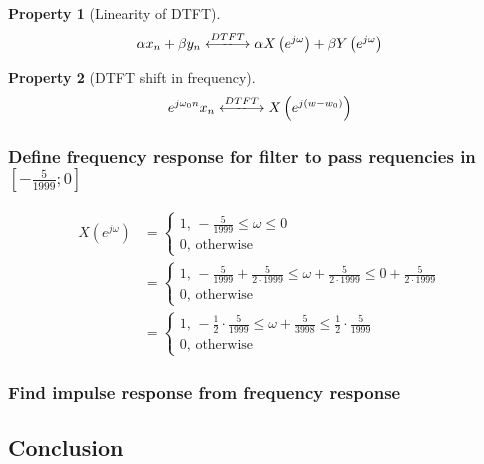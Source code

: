 \documentclass[a4paper]{article}
\theoremstyle{break}
\theoremstyle{break}
\newtheorem{property}{Property}[section]
\begin{document}
\begin{property}[Linearity of DTFT] \label{prop:dtft_lin}
  \begin{equation} \label{eq:dtft_lin}
    \alpha x_n + \beta y_n 
    \xlongleftrightarrow{DTFT}
    \alpha X \left( e^{j \omega} \right) + \beta Y \left( e^{j \omega} \right)
  \end{equation}
\end{property}

\begin{property}[DTFT shift in frequency] \label{prop:dtft_freq_shift}
  \begin{equation} \label{eq:dtft_freq_shift}
    e^{j \omega_0 n} x_n
    \xlongleftrightarrow{DTFT}
    X\left( e^{j (w - w_0)} \right)
  \end{equation}
\end{property}

\subsubsection*{Define frequency response for filter to pass requencies in $\left[ -\frac{5}{1999}; 0 \right]$}

\begin{equation*}
  \begin{split}
    X(e^{j \omega}) &= \begin{cases}
                         1, \, -\frac{5}{1999} \leq \omega \leq 0 \\
                         0, \, \text{otherwise}
                       \end{cases} \\
                    &= \begin{cases}
                         1, \, -\frac{5}{1999} + \frac{5}{2 \cdot 1999} \leq \omega + \frac{5}{2 \cdot 1999} \leq 0 + \frac{5}{2 \cdot 1999} \\
                         0, \, \text{otherwise}
                       \end{cases} \\
                    &= \begin{cases}
                         1, \, - \frac{1}{2} \cdot \frac{5}{1999} \leq \omega + \frac{5}{3998} \leq \frac{1}{2} \cdot \frac{5}{1999} \\
                         0, \, \text{otherwise}
                       \end{cases}
  \end{split}
\end{equation*}

\subsubsection*{Find impulse response from frequency response}


\subsection*{Conclusion}

\end{document}
